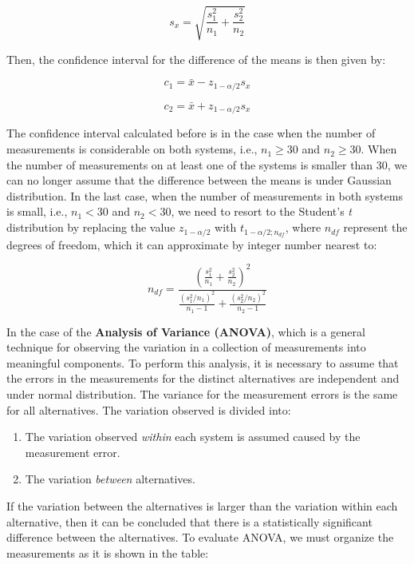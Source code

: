 \begin{equation}
  s_x = \sqrt{\frac{s_1^2}{n_1} + \frac{s_2^2}{n_2}}
\end{equation}

Then, the confidence interval for the difference of the means is then given
by:

\begin{equation}
  c_1 = \bar{x} - z_{1 - \alpha/2}s_x
\end{equation}

\begin{equation}
 c_2 = \bar{x} + z_{1 - \alpha/2}s_x
\end{equation}

The confidence interval calculated before is in the case when the number of
measurements is considerable on both systems, i.e., \(n_1 \ge 30\) and \(n_2
   \ge 30\). When the number of measurements on at least one of the systems is
smaller than 30, we can no longer assume that the difference between the means is
under Gaussian distribution. In the last case, when the number of
measurements in both systems is small, i.e., \(n_1 < 30\) and \(n_2 < 30\),
we need to resort to the Student's \emph{t} distribution by replacing the value
\(z_{1 - \alpha/2}\) with \(t_{1 - \alpha/2;n_{df}}\), where \(n_{df}\)
represent the degrees of freedom, which it can approximate by integer number
nearest to:

\begin{equation}
 n_{df} = \frac{(\frac{s_1^2}{n_1} + \frac{s_2^2}{n_2})^2}{\frac{(s_1^2/n_1)^2}{n_1 - 1} + \frac{(s_2^2/n_2)^2}{n_2 - 1}}
\end{equation}

In the case of the \textbf{Analysis of Variance (ANOVA)}, which is a general technique
for observing the variation in a collection of measurements into meaningful
components. To perform this analysis, it is necessary to assume that the errors
in the measurements for the distinct alternatives are independent and under
normal distribution. The variance for the measurement errors is the same
for all alternatives. The variation observed is divided into:

\begin{enumerate}
\item The variation observed \emph{within} each system is assumed caused by the
measurement error.
\item The variation \emph{between} alternatives.
\end{enumerate}

If the variation between the alternatives is larger than the variation within
each alternative, then it can be concluded that there is a statistically significant difference between the alternatives. To evaluate ANOVA, we must
organize the measurements as it is shown in the table:

